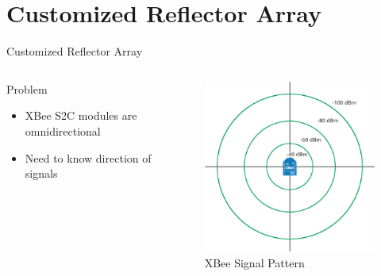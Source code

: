 \documentclass{beamer}
\begin{document}

\section{Customized Reflector Array}

\begin{frame}{Customized Reflector Array}
  \begin{columns}
      \begin{block}{Problem}
        \begin{itemize}
          \item XBee S2C modules are omnidirectional
          \item Need to know direction of signals
        \end{itemize}
      \end{block}
     \begin{figure}
      \centering
      \includegraphics[height=0.5\textheight]{figs/img/XBee_signal.png}
      \caption{XBee Signal Pattern}
      \label{fig:XBeeSignal}
    \end{figure}
  \end{columns}
\end{frame}
\end{document}
